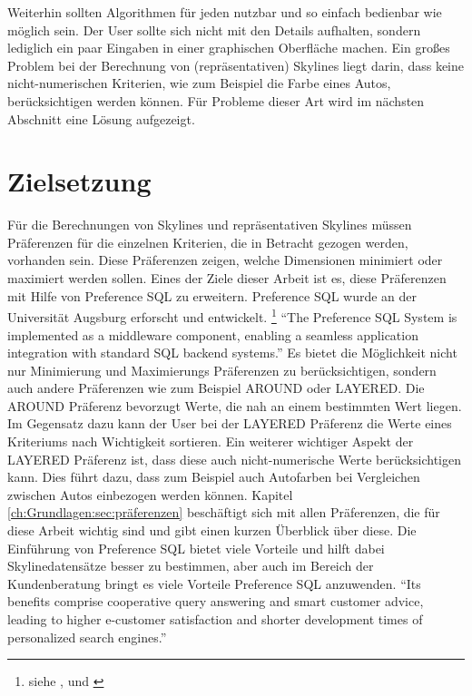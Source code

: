 Weiterhin sollten Algorithmen für jeden nutzbar und so einfach bedienbar wie möglich sein. Der User sollte sich nicht mit den Details aufhalten, sondern lediglich ein paar Eingaben in einer graphischen Oberfläche machen. 
Ein großes Problem bei der Berechnung von (repräsentativen) Skylines liegt darin, dass keine nicht-numerischen Kriterien, wie zum Beispiel die Farbe eines Autos, berücksichtigen werden können. 
Für Probleme dieser Art wird im nächsten Abschnitt eine Lösung aufgezeigt.
\section{Zielsetzung}
\label{ch:Einleitung:sec:Zielsetzung}
Für die Berechnungen von Skylines und repräsentativen Skylines müssen Präferenzen für die einzelnen Kriterien, die in Betracht gezogen werden, vorhanden sein. Diese Präferenzen zeigen, welche Dimensionen minimiert oder maximiert werden sollen.
Eines der Ziele dieser Arbeit ist es, diese Präferenzen mit Hilfe von Preference SQL zu erweitern. Preference SQL wurde an der Universität Augsburg erforscht und entwickelt. \footnote{siehe \cite{kiessling2011preference}, \cite{kiessling2002foundations} und \cite{kiessling2002preference}}
\enquote{The Preference SQL System is implemented as a middleware component, enabling a seamless application integration with standard SQL backend systems.} \cite[p. 1]{kiessling2011preference}
Es bietet die Möglichkeit nicht nur Minimierung und Maximierungs Präferenzen zu berücksichtigen, sondern auch andere Präferenzen wie zum Beispiel AROUND oder LAYERED. Die AROUND Präferenz bevorzugt Werte, die nah an einem bestimmten Wert liegen. Im Gegensatz dazu kann der User bei der LAYERED Präferenz die Werte eines Kriteriums nach Wichtigkeit sortieren. Ein weiterer wichtiger Aspekt der LAYERED Präferenz ist, dass diese auch nicht-numerische Werte berücksichtigen kann. Dies führt dazu, dass zum Beispiel auch Autofarben bei Vergleichen zwischen Autos einbezogen werden können. Kapitel \ref{ch:Grundlagen:sec:präferenzen} beschäftigt sich mit allen Präferenzen, die für diese Arbeit wichtig sind und gibt einen kurzen Überblick über diese.
Die Einführung von Preference SQL bietet viele Vorteile und hilft dabei Skylinedatensätze besser zu bestimmen, aber auch im Bereich der Kundenberatung bringt es viele Vorteile Preference SQL anzuwenden.
\enquote{Its benefits comprise cooperative query answering and smart customer advice, leading to higher e-customer satisfaction and shorter development times of personalized search engines.}\cite[p. 1]{kiessling2002preference}

